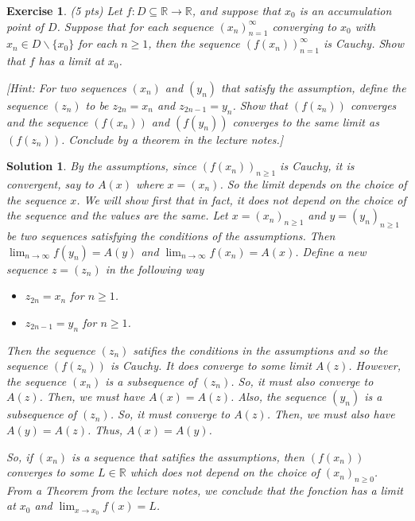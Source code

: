\documentclass[12pt]{article}
\newcommand{\bR}{\mathbb{R}}
\newcommand{\ra}{\rightarrow}
\theoremstyle{plain}
\newtheorem{exer}{\textbf{Exercise}}}
\theoremstyle{plain}
\newtheorem*{sol}{\textbf{Solution}}}
\begin{document}
\begin{exer}
(5 pts)
Let $f: D \subseteq \bR \ra \bR$, and suppose that $x_0$ is an accumulation point of $D$. Suppose that for each sequence $(x_n)_{n = 1}^\infty$ converging to $x_0$ with $x_n \in D\backslash \{ x_0 \}$ for each $n \geq 1$, then the sequence $(f(x_n))_{n = 1}^\infty$ is Cauchy. Show that $f$ has a limit at $x_0$.

[Hint: For two sequences $(x_n)$ and $(y_n)$ that satisfy the assumption, define the sequence $(z_n)$ to be $z_{2n} = x_n$ and $z_{2n - 1} = y_n$. Show that $(f(z_n))$ converges and the sequence $(f(x_n))$ and $(f(y_n))$ converges to the same limit as $(f(z_n))$. Conclude by a theorem in the lecture notes.]
\end{exer}
\begin{sol}
By the assumptions, since $(f(x_n))_{n \geq 1}$ is Cauchy, it is convergent, say to $A (x)$ where $x = (x_n)$. So the limit depends on the choice of the sequence $x$. We will show first that in fact, it does not depend on the choice of the sequence and the values are the same. Let $x = (x_n)_{n \geq 1}$ and $y = (y_n)_{n \geq 1}$ be two sequences satisfying the conditions of the assumptions. Then $\lim_{n \ra \infty} f(y_n) = A(y)$ and $\lim_{n \ra \infty} f(x_n) = A(x)$. Define a new sequence $z = (z_n)$ in the following way
	\begin{itemize}
	\item $z_{2n} = x_n$ for $n \geq 1$.
	\item $z_{2n -1} = y_n$ for $n \geq 1$.
	\end{itemize}
Then the sequence $(z_n)$ satifies the conditions in the assumptions and so the sequence $(f(z_n))$ is Cauchy. It does converge to some limit $A(z)$. However, the sequence $(x_n)$ is a subsequence of $(z_n)$. So, it must also converge to $A(z)$. Then, we must have $A(x) = A(z)$. Also, the sequence $(y_n)$ is a subsequence of $(z_n)$. So, it must converge to $A(z)$. Then, we must also have $A(y) = A(z)$. Thus, $A(x) = A(y)$. 

So, if $(x_n)$ is a sequence that satifies the assumptions, then $(f(x_n))$ converges to some $L \in \bR$ which does not depend on the choice of $(x_n)_{n \geq 0}$. From a Theorem from the lecture notes, we conclude that the fonction has a limit at $x_0$ and $\lim_{x \ra x_0} f(x) = L$.
\end{sol}
\end{document}

